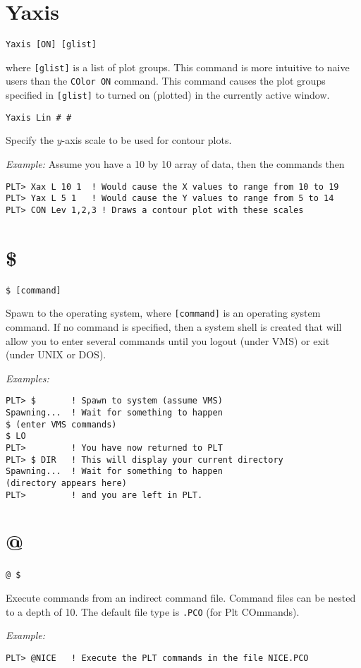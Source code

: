 \section*{Yaxis}
\begin{verbatim}
Yaxis [ON] [glist]
\end{verbatim}
   where {\tt [glist]} is a list of plot groups.  This command is more
intuitive to naive users than the {\tt COlor~ON} command.  This command
causes the plot groups specified in {\tt [glist]} to turned on (plotted) in
the currently active window.

\medskip
\begin{verbatim}
Yaxis Lin # #
\end{verbatim}
   Specify the $y$-axis scale to be used for contour plots.

\medskip\noindent
{\em Example:}
Assume you have a 10 by 10 array of data, then the commands then
\begin{verbatim}
PLT> Xax L 10 1  ! Would cause the X values to range from 10 to 19
PLT> Yax L 5 1   ! Would cause the Y values to range from 5 to 14
PLT> CON Lev 1,2,3 ! Draws a contour plot with these scales
\end{verbatim}

\section*{\$}
\begin{verbatim}
$ [command]
\end{verbatim}
   Spawn to the operating system, where {\tt [command]} is an operating
system command.  If no command is specified, then a system shell is
created that will allow you to enter several commands until you logout
(under VMS) or exit (under UNIX or DOS).

\medskip\noindent
{\em Examples:}
\begin{verbatim}
PLT> $       ! Spawn to system (assume VMS)
Spawning...  ! Wait for something to happen
$ (enter VMS commands)
$ LO
PLT>         ! You have now returned to PLT
PLT> $ DIR   ! This will display your current directory
Spawning...  ! Wait for something to happen
(directory appears here)
PLT>         ! and you are left in PLT.
\end{verbatim}

\section*{@}
\begin{verbatim}
@ $
\end{verbatim}
   Execute commands from an indirect command file.  Command files
can be nested to a depth of 10.  The default file type is {\tt .PCO} (for
Plt COmmands).

\medskip\noindent
{\em Example:}
\begin{verbatim}
PLT> @NICE   ! Execute the PLT commands in the file NICE.PCO
\end{verbatim}
